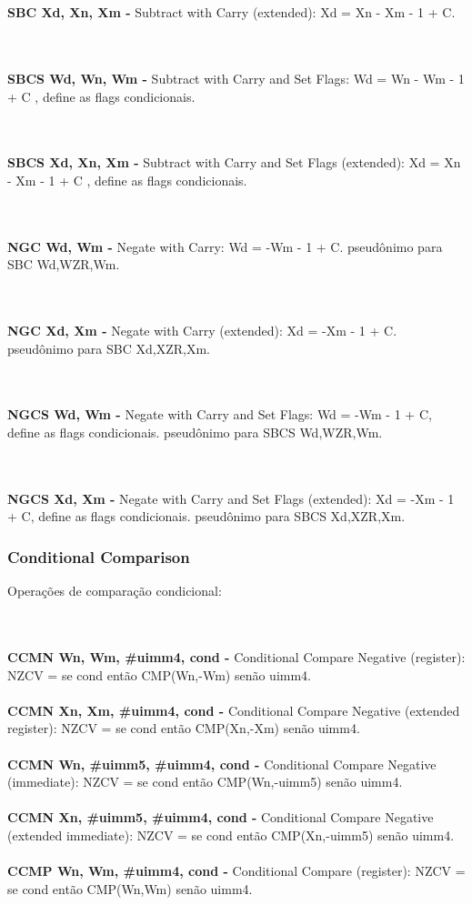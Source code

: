 \documentclass[12pt,a4paper,utf8]{ppgsi}
\begin{document}
\\\\\textbf{SBC Xd, Xn, Xm -} Subtract with Carry (extended): Xd = Xn - Xm - 1 + C. 

\\\\\textbf{SBCS Wd, Wn, Wm -} Subtract with Carry and Set Flags: Wd = Wn - Wm - 1 + C , define as flags condicionais. 

\\\\\textbf{SBCS Xd, Xn, Xm -} Subtract with Carry and Set Flags (extended): Xd = Xn - Xm - 1 + C , define as flags condicionais. 

\\\\\textbf{NGC Wd, Wm -} Negate with Carry: Wd = -Wm - 1 + C.
pseudônimo para SBC Wd,WZR,Wm.

\\\\\textbf{NGC Xd, Xm -} Negate with Carry (extended): Xd = -Xm - 1 + C.
pseudônimo para SBC Xd,XZR,Xm.

\\\\\textbf{NGCS Wd, Wm -} Negate with Carry and Set Flags: Wd = -Wm - 1 + C, define as flags condicionais. 
pseudônimo para SBCS Wd,WZR,Wm.

\\\\\textbf{NGCS Xd, Xm -} Negate with Carry and Set Flags (extended): Xd = -Xm - 1 + C, define as flags condicionais. 
pseudônimo para SBCS Xd,XZR,Xm.


\subsubsection{Conditional Comparison}
Operações de comparação condicional:

\\\\\textbf{CCMN Wn, Wm, \#uimm4, cond -} Conditional Compare Negative (register):
NZCV = se cond então CMP(Wn,-Wm) senão uimm4. 
\\\\\textbf{CCMN Xn, Xm, \#uimm4, cond -} Conditional Compare Negative (extended register):
NZCV = se cond então CMP(Xn,-Xm) senão uimm4. 
\\\\\textbf{CCMN Wn, \#uimm5, \#uimm4, cond -} Conditional Compare Negative (immediate):
NZCV = se cond então CMP(Wn,-uimm5) senão uimm4. 
\\\\\textbf{CCMN Xn, \#uimm5, \#uimm4, cond -} Conditional Compare Negative (extended immediate):
NZCV = se cond então CMP(Xn,-uimm5) senão uimm4.
\\\\\textbf{CCMP Wn, Wm, \#uimm4, cond -} Conditional Compare (register):
NZCV = se cond então CMP(Wn,Wm) senão uimm4. 
\end{document}

